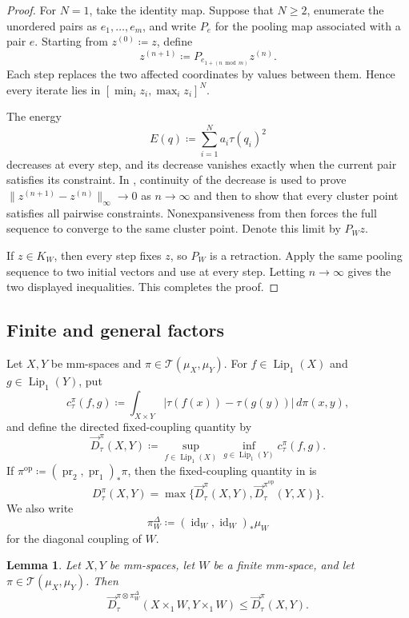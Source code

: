 \documentclass[11pt]{amsart}
\theoremstyle{plain}
\newtheorem{lemma}[theorem]{Lemma}
\theoremstyle{definition}
\theoremstyle{remark}
\newcommand{\T}{\mathcal T}
\DeclareMathOperator{\pr}{pr}
\begin{document}
\begin{proof}
For $N=1$, take the identity map. Suppose that $N\geq2$, enumerate the unordered pairs as $e_1,\ldots,e_m$, and write $P_e$ for the pooling map associated with a pair $e$. Starting from $z^{(0)}\coloneqq z$, define
\[
z^{(n+1)}\coloneqq P_{e_{1+(n\bmod m)}}z^{(n)}.
\]
Each step replaces the two affected coordinates by values between them. Hence every iterate lies in $[\min_i z_i,\max_i z_i]^N$.

The energy
\[
E(q)\coloneqq\sum_{i=1}^Na_i\tau(q_i)^2
\]
decreases at every step, and its decrease vanishes exactly when the current pair satisfies its constraint. In , continuity of the decrease is used to prove $\|z^{(n+1)}-z^{(n)}\|_\infty\to0$ as $n\to\infty$ and then to show that every cluster point satisfies all pairwise constraints. Nonexpansiveness from  then forces the full sequence to converge to the same cluster point. Denote this limit by $P_Wz$.

If $z\in K_W$, then every step fixes $z$, so $P_W$ is a retraction. Apply the same pooling sequence to two initial vectors and use  at every step. Letting $n\to\infty$ gives the two displayed inequalities. This completes the proof.
\end{proof}

\subsection{Finite and general factors}
\label{subsec:factor-contraction}

Let $X,Y$ be mm-spaces and $\pi\in\T(\mu_X,\mu_Y)$. For $f\in\operatorname{Lip}_1(X)$ and $g\in\operatorname{Lip}_1(Y)$, put
\[
c_\tau^\pi(f,g)\coloneqq\int_{X\times Y}|\tau(f(x))-\tau(g(y))|\,d\pi(x,y),
\]
and define the directed fixed-coupling quantity by
\[
\overrightarrow D_\tau^\pi(X,Y)\coloneqq\sup_{f\in\operatorname{Lip}_1(X)}\inf_{g\in\operatorname{Lip}_1(Y)}c_\tau^\pi(f,g).
\]
If $\pi^{\mathrm{op}}\coloneqq(\pr_2,\pr_1)_*\pi$, then the fixed-coupling quantity in  is
\[
D_\tau^\pi(X,Y)=\max\{\overrightarrow D_\tau^\pi(X,Y),\overrightarrow D_\tau^{\pi^{\mathrm{op}}}(Y,X)\}.
\]
We also write
\[
\pi_W^\Delta\coloneqq(\operatorname{id}_W,\operatorname{id}_W)_*\mu_W
\]
for the diagonal coupling of $W$.

\begin{lemma}
\label{lem:finite-factor-contraction}
Let $X,Y$ be mm-spaces, let $W$ be a finite mm-space, and let $\pi\in\T(\mu_X,\mu_Y)$. Then
\[
\overrightarrow D_\tau^{\pi\otimes\pi_W^\Delta}(X\times_1W,Y\times_1W)\leq\overrightarrow D_\tau^\pi(X,Y).
\]
\end{lemma}
\end{document}
